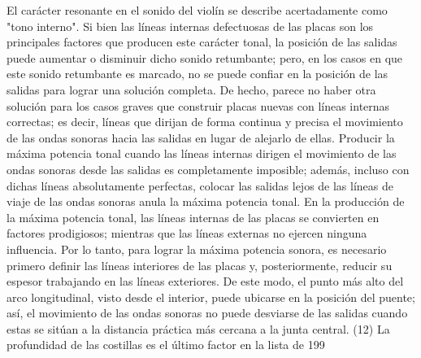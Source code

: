 El carácter resonante en el sonido del violín se describe acertadamente como "tono interno". Si bien las líneas internas defectuosas de las placas son los principales factores que producen este carácter tonal, la posición de las salidas puede aumentar o disminuir dicho sonido retumbante; pero, en los casos en que este sonido retumbante es marcado, no se puede confiar en la posición de las salidas para lograr una solución completa. De hecho, parece no haber otra solución para los casos graves que construir placas nuevas con líneas internas correctas; es decir, líneas que dirijan de forma continua y precisa el movimiento de las ondas sonoras hacia las salidas en lugar de alejarlo de ellas. Producir la máxima potencia tonal cuando las líneas internas dirigen el movimiento de las ondas sonoras desde las salidas es completamente imposible; además, incluso con dichas líneas absolutamente perfectas, colocar las salidas lejos de las líneas de viaje de las ondas sonoras anula la máxima potencia tonal. En la producción de la máxima potencia tonal, las líneas internas de las placas se convierten en factores prodigiosos; mientras que las líneas externas no ejercen ninguna influencia. Por lo tanto, para lograr la máxima potencia sonora, es necesario primero definir las líneas interiores de las placas y, posteriormente, reducir su espesor trabajando en las líneas exteriores. De este modo, el punto más alto del arco longitudinal, visto desde el interior, puede ubicarse en la posición del puente; así, el movimiento de las ondas sonoras no puede desviarse de las salidas cuando estas se sitúan a la distancia práctica más cercana a la junta central.
(12) La profundidad de las costillas es el último factor en la lista de
199

